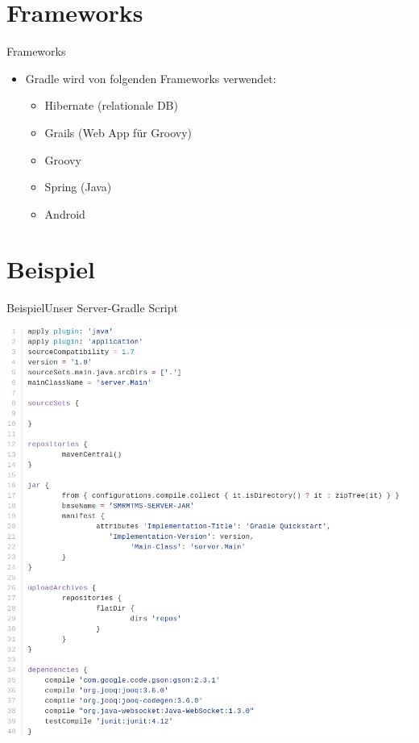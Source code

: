 \documentclass[10pt, xcolor=x11names]{beamer}			%
\begin{document}
	\section{Frameworks}
	\begin{frame}{Frameworks}
		\begin{itemize}[<+->]
			\item Gradle wird von folgenden Frameworks verwendet:
			\begin{itemize}[<+->]
				\item Hibernate (relationale DB)
				\item Grails (Web App für Groovy)
				\item Groovy
				\item Spring (Java)
				\item Android
			\end{itemize}
		\end{itemize}

	\end{frame}

	
	
	\section{Beispiel}
	\begin{frame}{Beispiel}{Unser Server-Gradle Script}
		\begin{center}
		       \includegraphics[width=\textwidth,height=\textheight,keepaspectratio]{gradle.png}
		\end{center}
	\end{frame}
\end{document}
